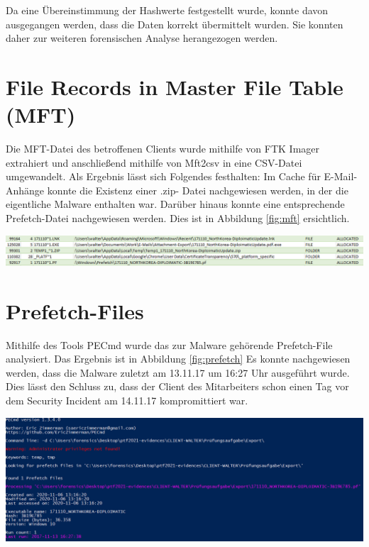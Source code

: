 Da eine Übereinstimmung der Hashwerte festgestellt wurde, konnte davon ausgegangen werden, dass die Daten korrekt übermittelt wurden. Sie konnten daher zur weiteren forensischen Analyse herangezogen werden.

\section{File Records in Master File Table (MFT)}
Die MFT-Datei des betroffenen Clients wurde mithilfe von FTK Imager extrahiert und anschließend mithilfe von Mft2csv in eine CSV-Datei umgewandelt. 
Als Ergebnis lässt sich Folgendes festhalten: Im Cache für E-Mail-Anhänge konnte die Existenz einer .zip- Datei  nachgewiesen werden, in der die eigentliche Malware enthalten war.  Darüber hinaus konnte eine entsprechende Prefetch-Datei  nachgewiesen werden. Dies ist in Abbildung \ref{fig:mft} ersichtlich.

\begin{center}
	\includegraphics[width=15.8cm]{figures/mft.png}
	\label{fig:mft}
\end{center}

\section{Prefetch-Files}
Mithilfe des Tools PECmd wurde das zur Malware gehörende Prefetch-File  analysiert. Das Ergebnis ist in Abbildung \ref{fig:prefetch}
Es konnte nachgewiesen werden, dass die Malware zuletzt am 13.11.17 um 16:27 Uhr ausgeführt wurde. Dies lässt den Schluss zu, dass der Client des Mitarbeiters schon einen Tag vor dem Security Incident am 14.11.17 kompromittiert war.

\begin{center}
	\includegraphics[width=15.8cm]{figures/prefetch.png}
	\label{fig:prefetch}
\end{center}

